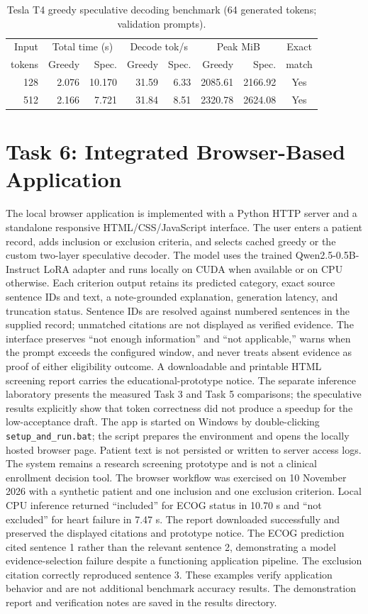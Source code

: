 \documentclass[conference]{IEEEtran}
\begin{document}
\begin{table}[t]
\centering
\caption{Tesla T4 greedy speculative decoding benchmark (64 generated tokens; validation prompts).}
\label{tab:specbench}
\begin{tabular}{r|rr|rr|rr|c}
\toprule
Input & \multicolumn{2}{c|}{Total time (s)} & \multicolumn{2}{c|}{Decode tok/s} & \multicolumn{2}{c|}{Peak MiB} & Exact\\
tokens & Greedy & Spec. & Greedy & Spec. & Greedy & Spec. & match\\
\midrule
128 & 2.076 & 10.170 & 31.59 & 6.33 & 2085.61 & 2166.92 & Yes\\
512 & 2.166 & 7.721 & 31.84 & 8.51 & 2320.78 & 2624.08 & Yes\\
\bottomrule
\end{tabular}
\end{table}
\section{Task 6: Integrated Browser-Based Application}
The local browser application is implemented with a Python HTTP server and a standalone responsive HTML/CSS/JavaScript interface. The user enters a patient record, adds inclusion or exclusion criteria, and selects cached greedy or the custom two-layer speculative decoder. The model uses the trained Qwen2.5-0.5B-Instruct LoRA adapter and runs locally on CUDA when available or on CPU otherwise. Each criterion output retains its predicted category, exact source sentence IDs and text, a note-grounded explanation, generation latency, and truncation status. Sentence IDs are resolved against numbered sentences in the supplied record; unmatched citations are not displayed as verified evidence. The interface preserves ``not enough information'' and ``not applicable,'' warns when the prompt exceeds the configured window, and never treats absent evidence as proof of either eligibility outcome. A downloadable and printable HTML screening report carries the educational-prototype notice. The separate inference laboratory presents the measured Task 3 and Task 5 comparisons; the speculative results explicitly show that token correctness did not produce a speedup for the low-acceptance draft. The app is started on Windows by double-clicking \texttt{setup\_and\_run.bat}; the script prepares the environment and opens the locally hosted browser page. Patient text is not persisted or written to server access logs. The system remains a research screening prototype and is not a clinical enrollment decision tool.
The browser workflow was exercised on 10 November 2026 with a synthetic patient and one inclusion and one exclusion criterion. Local CPU inference returned ``included'' for ECOG status in 10.70 s and ``not excluded'' for heart failure in 7.47 s. The report downloaded successfully and preserved the displayed citations and prototype notice. The ECOG prediction cited sentence 1 rather than the relevant sentence 2, demonstrating a model evidence-selection failure despite a functioning application pipeline. The exclusion citation correctly reproduced sentence 3. These examples verify application behavior and are not additional benchmark accuracy results. The demonstration report and verification notes are saved in the results directory.

\end{document}
